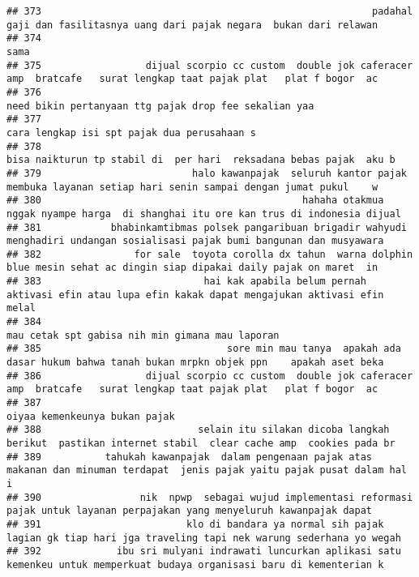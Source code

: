 \documentclass[
]{article}
\begin{document}
\begin{verbatim}
## 373                                                         padahal gaji dan fasilitasnya uang dari pajak negara  bukan dari relawan
## 374                                                                                                                             sama
## 375                  dijual scorpio cc custom  double jok caferacer amp  bratcafe   surat lengkap taat pajak plat   plat f bogor  ac
## 376                                                                            need bikin pertanyaan ttg pajak drop fee sekalian yaa
## 377                                                                                     cara lengkap isi spt pajak dua perusahaan s 
## 378                                                             bisa naikturun tp stabil di  per hari  reksadana bebas pajak  aku b 
## 379                          halo kawanpajak  seluruh kantor pajak membuka layanan setiap hari senin sampai dengan jumat pukul    w 
## 380                                             hahaha otakmua nggak nyampe harga  di shanghai itu ore kan trus di indonesia dijual 
## 381            bhabinkamtibmas polsek pangaribuan brigadir wahyudi menghadiri undangan sosialisasi pajak bumi bangunan dan musyawara
## 382                for sale  toyota corolla dx tahun  warna dolphin blue mesin sehat ac dingin siap dipakai daily pajak on maret  in
## 383                            hai kak apabila belum pernah aktivasi efin atau lupa efin kakak dapat mengajukan aktivasi efin melal 
## 384                                                                                  mau cetak spt gabisa nih min gimana mau laporan
## 385                                sore min mau tanya  apakah ada dasar hukum bahwa tanah bukan mrpkn objek ppn    apakah aset beka 
## 386                  dijual scorpio cc custom  double jok caferacer amp  bratcafe   surat lengkap taat pajak plat   plat f bogor  ac
## 387                                                                                                    oiyaa kemenkeunya bukan pajak
## 388                           selain itu silakan dicoba langkah berikut  pastikan internet stabil  clear cache amp  cookies pada br 
## 389           tahukah kawanpajak  dalam pengenaan pajak atas makanan dan minuman terdapat  jenis pajak yaitu pajak pusat dalam hal i
## 390                 nik  npwp  sebagai wujud implementasi reformasi pajak untuk layanan perpajakan yang menyeluruh kawanpajak dapat 
## 391                         klo di bandara ya normal sih pajak lagian gk tiap hari jga traveling tapi nek warung sederhana yo wegah 
## 392             ibu sri mulyani indrawati luncurkan aplikasi satu kemenkeu untuk memperkuat budaya organisasi baru di kementerian k 

\end{verbatim}
\end{document}
